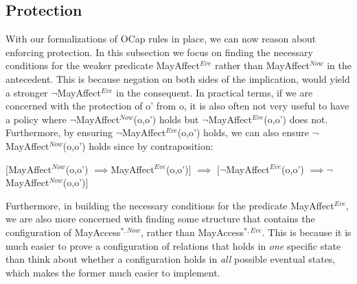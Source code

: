 \documentclass[a4paper,11pt, twoside,twocolumn]{article}
\newenvironment{logic}[1][]
{\begin{flushleft} \small }
{\end{flushleft}}
\newcommand{\loimplies}{$\implies$}
\newcommand{\loneg}{$\boldsymbol \neg$}
\newcommand{\ablock} {\null\qquad}
\begin{document}
\subsection{Protection}\label{protection}
With our formalizations of OCap rules in place, we can now reason about enforcing protection. In this subsection we focus on finding the necessary conditions for the weaker predicate MayAffect$^{Eve}$ rather than MayAffect$^{Now}$ in the antecedent. This is because negation on both sides of the implication, would yield a stronger \loneg MayAffect$^{Eve}$ in the consequent. In practical terms, if we are concerned with the protection of o' from o, it is also often not very useful to have a policy where \loneg MayAffect$^{Now}$(o,o') holds but \loneg MayAffect$^{Eve}$(o,o') does not. Furthermore, by ensuring \loneg MayAffect$^{Eve}$(o,o') holds, we can also ensure \loneg MayAffect$^{Now}$(o,o') holds since by contraposition:

\begin{logic}
$[$MayAffect$^{Now}$(o,o') \loimplies MayAffect$^{Eve}$(o,o')$]$\linebreak
\ablock \loimplies\linebreak
$[$\loneg MayAffect$^{Eve}$(o,o') \loimplies \loneg MayAffect$^{Now}$(o,o')$]$\\
\end{logic}

Furthermore, in building the necessary conditions for the predicate MayAffect$^{Eve}$, we are also more concerned with finding some structure that contains the configuration of MayAccess$^{*,Now}$, rather than MayAccess$^{*,Eve}$. This is because it is much easier to prove a configuration of relations that holds in \textit{one} specific state than think about whether a configuration holds in \textit{all} possible eventual states, which makes the former much easier to implement.\\
\end{document}
